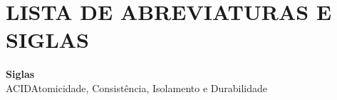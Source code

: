 \documentclass[
12pt,
a4paper,
semrecuonosumario,
sumario = abnt-6027-2012]{report}
\begin{document}
	\newpage
	\section*{\centering \small\bfseries LISTA DE ABREVIATURAS E SIGLAS}
	\textbf{Siglas}\\

	\noindent
	ACID\hspace{1cm}Atomicidade, Consistência, Isolamento e Durabilidade
	\clearpage

	\renewcommand{\cftdotsep}{1}

	\renewcommand{\contentsname}{\MakeUppercase{Sumário}}
	\renewcommand{\cfttoctitlefont}{\bfseries\small} %
	\renewcommand{\cftaftertoctitle}{\hfill\par}           %
	\renewcommand{\cftchapfont}{\bfseries}
	\renewcommand{\cftchappagefont}{\bfseries}

	\renewcommand{\cftsecfont}{\bfseries}
	\renewcommand{\cftsecpagefont}{\bfseries}

	\renewcommand{\cftsubsecfont}{\bfseries}
	\renewcommand{\cftsubsecpagefont}{\bfseries}

	\setlength{\cftbeforetoctitleskip}{0pt}
	\setlength{\cftaftertoctitleskip}{2ex}


	\setcounter{tocdepth}{2}
	\tableofcontents
	\newpage

	\titleformat{\chapter}{\bfseries\small}{\thechapter}{1em}{}
	\titlespacing*{\chapter}{0pt}{2.5ex}{1.5ex}
	\titleformat{\section}{\bfseries\small}{\thesection}{1em}{}
	\titlespacing*{\section}{0pt}{2.0ex}{1.0ex}
\end{document}
